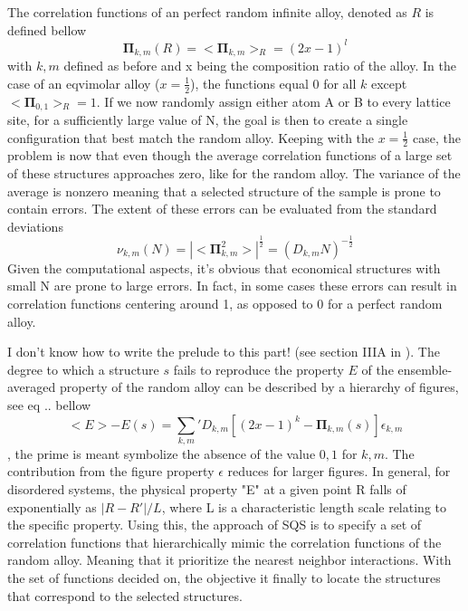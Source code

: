 The correlation functions of an perfect random infinite alloy, denoted as $R$ is defined bellow
\begin{equation}
    \boldsymbol{\Pi}_{k,m}(R) = <\boldsymbol{\Pi}_{k,m}>_R = (2x-1)^l 
\end{equation}
with $k, m$ defined as before and x being the composition ratio of the alloy. In the case of an eqvimolar alloy ($x=\frac{1}{2}$), the functions equal 0 for all $k$ except $<\boldsymbol{\Pi}_{0,1}>_R = 1$. If we now randomly assign either atom A or B to every lattice site, for a sufficiently large value of N, the goal is then to create a single configuration that best match the random alloy. Keeping with the $x=\frac{1}{2}$ case, the problem is now that even though the average correlation functions of a large set of these structures approaches zero, like for the random alloy. The variance of the average is nonzero meaning that a selected structure of the sample is prone to contain errors. The extent of these errors can be evaluated from the standard deviations
\begin{equation}
    \nu_{k,m}(N) = |<\boldsymbol{\Pi}^{2}_{k,m}>|^{\frac{1}{2}} = (D_{k,m}N)^{-\frac{1}{2}}
\end{equation}
Given the computational aspects, it's obvious that economical structures with small N are prone to large errors. In fact, in some cases these errors can result in correlation functions centering around 1, as opposed to 0 for a perfect random alloy.  

I don't know how to write the prelude to this part! (see section IIIA in \cite{sqsfull}). The degree to which a structure $s$ fails to reproduce the property $E$ of the ensemble-averaged property of the random alloy can be described by a hierarchy of figures, see eq .. bellow
\begin{equation}
    <E> - E(s) = \sum_{k,m}' D_{k,m}[(2x-1)^k-\boldsymbol{\Pi}_{k,m}(s)]\epsilon_{k,m}
\end{equation}
, the prime is meant symbolize the absence of the value $0,1$ for $k,m$. The contribution from the figure property $\epsilon$ reduces for larger figures. In general, for disordered systems, the physical property "E" at a given point R falls of exponentially as $|R-R'|/L$, where L is a characteristic length scale relating to the specific property. Using this, the approach of SQS is to specify a set of correlation functions that hierarchically mimic the correlation functions of the random alloy. Meaning that it prioritize the nearest neighbor interactions. With the set of functions decided on, the objective it finally to locate the structures that correspond to the selected structures. 

